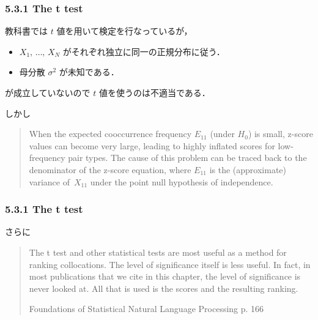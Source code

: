 \documentclass[10pt,leqno]{beamer}
\begin{document}
\begin{frame}
    \frametitle{5.3.1 The t test}
    教科書では $t$ 値を用いて検定を行なっているが，
    \begin{itemize}
        \item $X_1,\,\ldots,\,X_N$ がそれぞれ独立に同一の正規分布に従う．
        \item 母分散 $\sigma^2$ が未知である．
    \end{itemize}
    が成立していないので $t$ 値を使うのは不適当である．

    \bigskip

    しかし
    \begin{quote}
        When the expected cooccurrence frequency $E_{11}$ (under $H_0$) is small, z-score values can become very large,
        leading to highly inflated scores for low-frequency pair types.
        The cause of this problem can be traced back to the denominator of the z-score equation,
        where $E_{11}$ is the (approximate) variance of $\,X_{11}$ under the point null hypothesis of independence.
        \begin{flushright}
        \end{flushright}
    \end{quote}

\end{frame}

\begin{frame}
    \frametitle{5.3.1 The t test}
    さらに
    \begin{quote}
        The t test and other statistical tests are most useful as
        a method for ranking collocations. The level of significance itself is less
        useful. In fact, in most publications that we cite in this chapter, the level
        of significance is never looked at. All that is used is the scores and the
        resulting ranking.
        \begin{flushright}
            Foundations of Statistical Natural Language Processing p. 166
        \end{flushright}
    \end{quote}
\end{frame}
\end{document}
